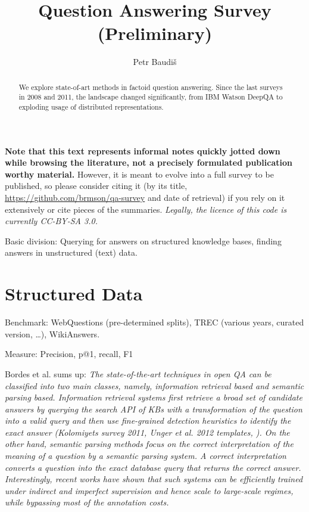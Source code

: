 \documentclass[11pt,a4paper]{article}
\title{Question Answering Survey (Preliminary)}
\author{Petr Baudiš}
\begin{document}
\maketitle

\begin{abstract}%
	We explore state-of-art methods in factoid question answering.
	Since the last surveys in 2008 and 2011, the landscape changed
	significantly, from IBM Watson DeepQA to exploding usage of
	distributed representations.
\end{abstract}

\vspace{3ex}

\textbf{%
Note that this text represents informal notes quickly jotted down while browsing
the literature, not a precisely formulated publication worthy material.
}
However, it is meant to evolve into a full survey to be published, so please
consider citing it (by its title, \url{https://github.com/brmson/qa-survey}
and date of retrieval) if you rely on it extensively or cite pieces of
the summaries. \textit{Legally, the licence of this code is currently CC-BY-SA 3.0.}

Basic division:  Querying for answers on structured knowledge bases,
finding answers in unstructured (text) data.

\section{Structured Data}

Benchmark:  WebQuestions (pre-determined splits), TREC (various years, curated version, \dots), WikiAnswers.

Measure: Precision, p@1, recall, F1

Bordes et al. \cite{Semantic2014Bordes} sums up:
\textit{%
The state-of-the-art techniques in open QA can be classified into two main
classes, namely, information retrieval based and semantic parsing based. Information
retrieval systems first retrieve a broad set of candidate answers by querying
the search API of KBs with a transformation of the question into a valid
query and then use fine-grained detection heuristics to identify the exact answer
(Kolomiyets survey 2011, Unger et al. 2012 templates, \cite{TreeFreebase2014Yao}).
On the other hand, semantic parsing methods focus on the correct
interpretation of the meaning of a question by a semantic parsing system. A
correct interpretation converts a question into the exact database query that
returns the correct answer. Interestingly, recent works \cite{Semantic2013Berant} \cite{SPBerant2014Paraphrase} \cite{OQA} have shown that
such systems can be efficiently trained under indirect and imperfect supervision
and hence scale to large-scale regimes, while bypassing most of the annotation
costs.}
\end{document}
